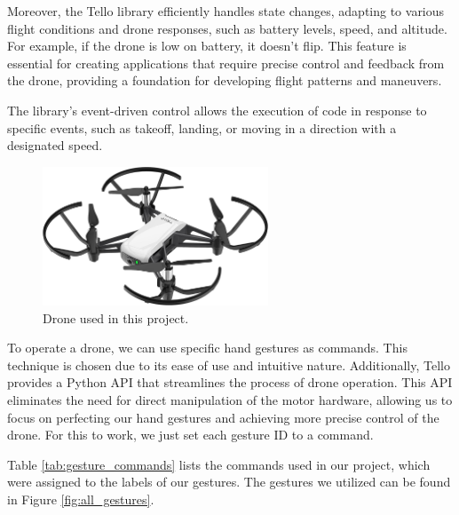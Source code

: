Moreover, the Tello library efficiently handles state changes, adapting to various flight conditions and drone responses, such as battery levels, speed, and altitude. For example, if the drone is low on battery, it doesn't flip. This feature is essential for creating applications that require precise control and feedback from the drone, providing a foundation for developing flight patterns and maneuvers.

The library's event-driven control allows the execution of code in response to specific events, such as takeoff, landing, or moving in a direction with a designated speed.

\begin{figure}[h!]
	\centering
	\includegraphics[width = 0.6\textwidth]{images/drone.jpg}
	\caption{Drone used in this project.}
	\label{fig:tello}
\end{figure}

To operate a drone, we can use specific hand gestures as commands. This technique is chosen due to its ease of use and intuitive nature. Additionally, Tello provides a Python API that streamlines the process of drone operation. This API eliminates the need for direct manipulation of the motor hardware, allowing us to focus on perfecting our hand gestures and achieving more precise control of the drone. For this to work, we just set each gesture ID to a command.



Table \ref{tab:gesture_commands} lists the commands used in our project, which were assigned to the labels of our gestures. The gestures we utilized can be found in Figure \ref{fig:all_gestures}.

